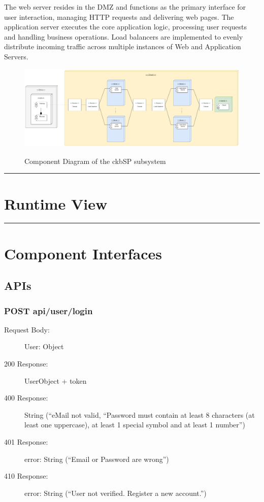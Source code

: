 \documentclass{Configuration_Files/Template}
\begin{document}
The web server resides in the DMZ and functions as the primary interface for user interaction, managing HTTP requests and delivering web pages. The application server executes the core application logic, processing user requests and handling business operations. Load balancers are implemented to evenly distribute incoming traffic across multiple instances of Web and Application Servers.

\begin{figure}[H]
\centering
\includegraphics[scale = 0.4]{DD_latex/Images/diagrams/Deployment_view.png}\\
\caption{Component Diagram of the ckbSP subsystem}
\end{figure}

{\color{bluepoli}\rule{\linewidth}{0.1pt}}

\section{Runtime View}

{\color{bluepoli}\rule{\linewidth}{0.1pt}}

\section{Component Interfaces}

\subsection{APIs}

\subsubsection{POST api/user/login}
\begin{description}
    \item[Request Body:] User: Object
    \item[200 Response:] UserObject + token
    \item[400 Response:] String (“eMail not valid, “Password must contain at least 8 characters (at least one uppercase), at least 1 special symbol and at least 1 number”)
    \item[401 Response:] error: String (“Email or Password are wrong”)
    \item[410 Response:] error: String (“User not verified. Register a new account.”)
\end{description}
\end{document}
